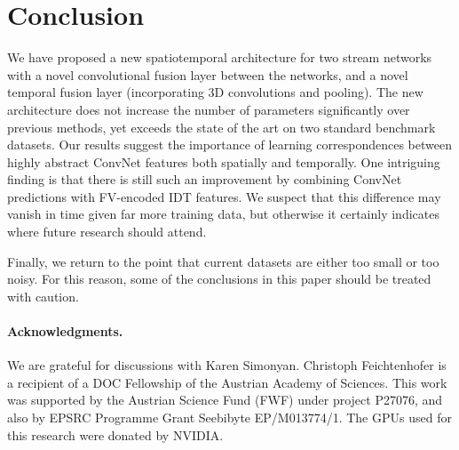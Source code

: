 \documentclass[10pt,twocolumn,letterpaper]{article}
\begin{document}
 	\section{Conclusion}

We have proposed a new spatiotemporal architecture for two stream
networks with a novel convolutional fusion layer between the networks,
and a novel temporal fusion layer (incorporating 3D convolutions and
pooling).  The new architecture does not increase the number of
parameters significantly over previous methods, yet exceeds the state
of the art on two standard benchmark datasets.  Our results suggest the importance of learning correspondences between highly abstract ConvNet features both spatially and temporally. 
One intriguing finding is that there is still such an improvement by
combining ConvNet predictions with FV-encoded IDT
features. We suspect that this difference may vanish in time given far
more training data, but otherwise it certainly indicates where future
research should attend.

Finally, we return to the point that current datasets are either too small or too 
noisy. For this reason, some of the conclusions in this paper should be treated
with caution.
 


\vspace*{-3mm}
\paragraph{Acknowledgments.}
We are grateful for discussions with Karen Simonyan.
Christoph Feichtenhofer is a recipient of a DOC Fellowship of the
Austrian Academy of Sciences.
This work was supported by the Austrian Science Fund (FWF)
under project P27076, and also by EPSRC Programme Grant Seebibyte 
EP/M013774/1. The GPUs used for this research were donated by NVIDIA.


{\small



}
\end{document}
